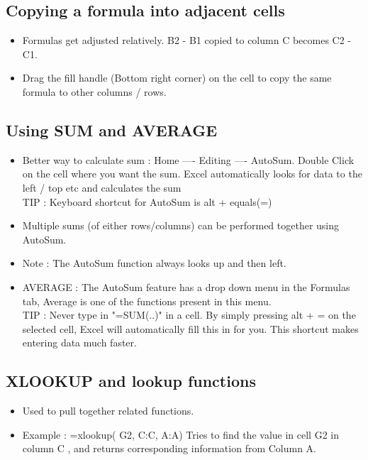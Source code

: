 \documentclass[11pt, oneside]{article}   	%
\begin{document}
\subsection{Copying a formula into adjacent cells}
\begin{itemize}
\item Formulas get adjusted relatively. B2 - B1 copied to column C becomes C2 - C1.
\item Drag the fill handle (Bottom right corner) on the cell to copy the same formula to other columns / rows.
\end{itemize}
\subsection{Using SUM and AVERAGE}
\begin{itemize}
\item Better way to calculate sum : Home ---- Editing ---- AutoSum. Double Click on the cell where you want the sum. Excel automatically looks for data to the left / top etc and calculates the sum \\
TIP : Keyboard shortcut for AutoSum is alt + equals(=)
\item Multiple sums (of either rows/columns) can be performed together using AutoSum.
\item Note : The AutoSum function always looks up and then left.
\item AVERAGE : The AutoSum feature has a drop down menu in the Formulas tab, Average is one of the functions present in this menu.
\bigskip \\
TIP : Never type in "=SUM(..)" in a cell. By simply pressing alt + = on the selected cell, Excel will automatically fill this in for you. This shortcut makes entering data much faster.
\end{itemize}
\subsection{XLOOKUP and lookup functions}
\begin{itemize}
\item Used to pull together related functions.
\item Example : =xlookup( G2, C:C, A:A) Tries to find the value in cell G2 in column C , and returns corresponding information from Column A.
\end{itemize}
\end{document}
